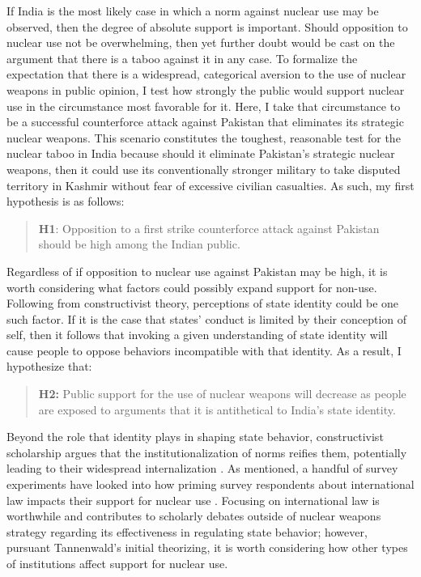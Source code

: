 \documentclass[12pt]{article}
\begin{document}
If India is the most likely case in which a norm against nuclear use may be observed, then the degree of absolute support is important. Should opposition to nuclear use not be overwhelming, then yet further doubt would be cast on the argument that there is a taboo against it in any case. To formalize the expectation that there is a widespread, categorical aversion to the use of nuclear weapons in public opinion, I test how strongly the public would support nuclear use in the circumstance most favorable for it. Here, I take that circumstance to be a successful counterforce attack against Pakistan that eliminates its strategic nuclear weapons. This scenario constitutes the toughest, reasonable test for the nuclear taboo in India because should it eliminate Pakistan's strategic nuclear weapons, then it could use its conventionally stronger military to take disputed territory in Kashmir without fear of excessive civilian casualties. As such, my first hypothesis is as follows: 

\begin{quote}
\textbf{H1}: Opposition to a first strike counterforce attack against Pakistan should be high among the Indian public.
\end{quote}

Regardless of if opposition to nuclear use against Pakistan may be high, it is worth considering what factors could possibly expand support for non-use. Following from constructivist theory, perceptions of state identity could be one such factor. If it is the case that states' conduct is limited by their conception of self, then it follows that invoking a given understanding of state identity will cause people to oppose behaviors incompatible with that identity. As a result, I hypothesize that:

\begin{quote}
\textbf{H2:} Public support for the use of nuclear weapons will decrease as people are exposed to arguments that it is antithetical to India's state identity.
\end{quote}

Beyond the role that identity plays in shaping state behavior, constructivist scholarship argues that the institutionalization of norms reifies them, potentially leading to their widespread internalization \citep{tannenwald_nuclear_2007, finnemore_international_1998}. As mentioned, a handful of survey experiments have looked into how priming survey respondents about international law impacts their support for nuclear use \citep{carpenter_stopping_2020, sagan_does_2020, sagan_atomic_2024}.  Focusing on international law is worthwhile and contributes to scholarly debates outside of nuclear weapons strategy regarding its effectiveness in regulating state behavior; however, pursuant Tannenwald's initial theorizing, it is worth considering how other types of institutions affect support for nuclear use. 
\end{document}
